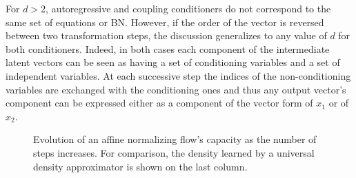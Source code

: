 \documentclass{article}
\begin{document}
For $d > 2$, autoregressive and coupling conditioners do not correspond to the same set of equations or BN. However, if the order of the vector is reversed between two transformation steps, the discussion generalizes to any value of $d$ for both conditioners. Indeed, in both cases each component of the intermediate latent vectors can be seen as having a set of conditioning variables and a set of independent variables. At each successive step the indices of the non-conditioning variables are exchanged with the conditioning ones and thus any output vector's component can be expressed either as a component of the vector form of $x_1$ or of $x_2$.

\begin{figure}
    \def\layersep{2.5cm}
    \centering
\hspace{-1.5em}
    \caption{Evolution of an affine normalizing flow's capacity as the number of steps increases. For comparison, the density learned by a universal density approximator is shown on the last column.}
    \label{fig:BN-steps}
    \vspace{-1.em}

\end{figure}
\end{document}
